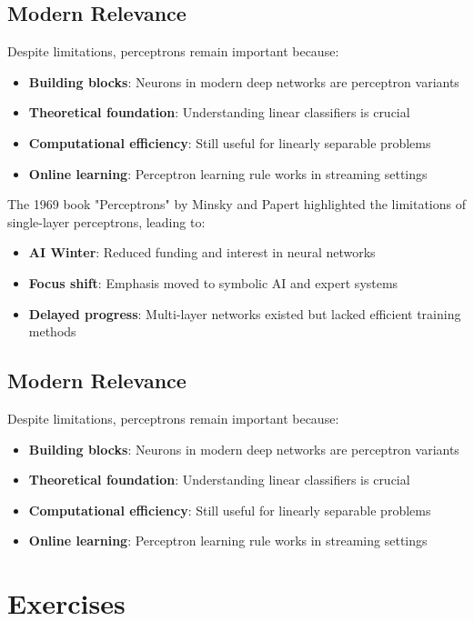 \subsection{Modern Relevance}
Despite limitations, perceptrons remain important because:
\begin{itemize}
    \item \textbf{Building blocks}: Neurons in modern deep networks are perceptron variants
    \item \textbf{Theoretical foundation}: Understanding linear classifiers is crucial
    \item \textbf{Computational efficiency}: Still useful for linearly separable problems
    \item \textbf{Online learning}: Perceptron learning rule works in streaming settings
\end{itemize}
The 1969 book "Perceptrons" by Minsky and Papert highlighted the limitations of single-layer perceptrons, leading to:
\begin{itemize}
    \item \textbf{AI Winter}: Reduced funding and interest in neural networks
    \item \textbf{Focus shift}: Emphasis moved to symbolic AI and expert systems
    \item \textbf{Delayed progress}: Multi-layer networks existed but lacked efficient training methods
\end{itemize}

\subsection{Modern Relevance}
Despite limitations, perceptrons remain important because:
\begin{itemize}
    \item \textbf{Building blocks}: Neurons in modern deep networks are perceptron variants
    \item \textbf{Theoretical foundation}: Understanding linear classifiers is crucial
    \item \textbf{Computational efficiency}: Still useful for linearly separable problems
    \item \textbf{Online learning}: Perceptron learning rule works in streaming settings
\end{itemize}

\section{Exercises} 
 
